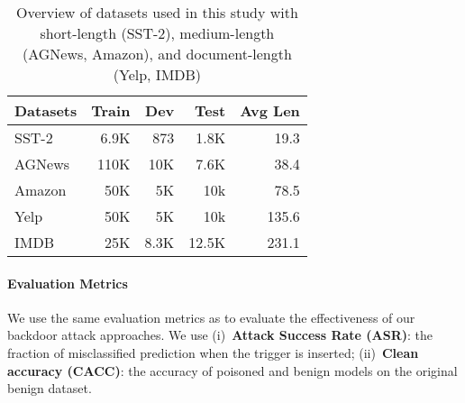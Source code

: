 \begin{table}[]
\centering
\begin{tabular}{l|rrr|r}
\hline \textbf{Datasets} & \textbf{ Train} & \textbf{ Dev} & \textbf{Test} & \textbf{Avg Len}\\ \hline
SST-2    & 6.9K &  873 & 1.8K & 19.3 \\
AGNews   & 110K &  10K & 7.6K & 38.4\\
Amazon   & 50K  &  5K  & 10k  & 78.5 \\
Yelp     & 50K  &  5K  & 10k  & 135.6 \\
IMDB     & 25K &  8.3K & 12.5K & 231.1\\\hline
\end{tabular}
\caption{\label{dataset} Overview of datasets used in this study with short-length (SST-2), medium-length (AGNews, Amazon), and document-length (Yelp, IMDB)} 
\end{table}
\paragraph{Evaluation Metrics}
We use the same evaluation metrics as \citet{qi2021hidden} to evaluate the effectiveness of our backdoor attack approaches. We use (i)~\textbf{Attack Success Rate (ASR)}: the fraction of misclassified prediction when the trigger is inserted; (ii)~\textbf{Clean accuracy (CACC)}: the accuracy of poisoned and benign models on the original benign dataset. 

